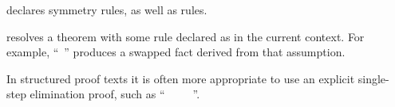 \begin{isabellebody}
\begin{isamarkuptext}
\begin{description}
  \item \hyperlink{attribute.sym}{\mbox{}} declares symmetry rules, as well as
  \hyperlink{attribute.Pure.elim}{\mbox{}} rules.

  \item \hyperlink{attribute.symmetric}{\mbox{}} resolves a theorem with some rule
  declared as \hyperlink{attribute.sym}{\mbox{}} in the current context.  For example,
  ``\hyperlink{command.assume}{\mbox{}}~'' produces a
  swapped fact derived from that assumption.

  In structured proof texts it is often more appropriate to use an
  explicit single-step elimination proof, such as ``\hyperlink{command.assume}{\mbox{}}~~\hyperlink{command.then}{\mbox{}}~\hyperlink{command.have}{\mbox{}}~~\hyperlink{command.ddot}{\mbox{}}''.


\end{description}
\end{isamarkuptext}
\end{isabellebody}
